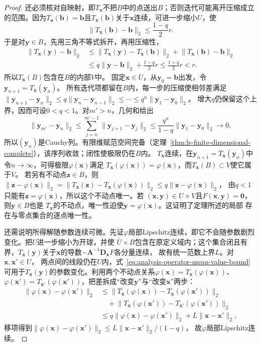 \begin{proof}
还必须核对自映射，即$T_{\bm x}$不把$B$中的点送出$B$；否则迭代可能离开压缩成立的范围。因为$T_{\bm{a}}(\bm{b})=\bm{b}$且$T_{\bm{x}}(\bm{b})$关于$\bm{x}$连续，可进一步缩小$U$，使
\[
 \lVert T_{\bm{x}}(\bm{b})-\bm{b}\rVert_2\leq\frac{1-q}{2}r.
\]
于是对$\bm{y}\in B$，先用三角不等式拆开，再用压缩性，
\[
 \begin{aligned}
  \lVert T_{\bm{x}}(\bm{y})-\bm{b}\rVert_2
  &\leq
  \lVert T_{\bm{x}}(\bm{y})-T_{\bm{x}}(\bm{b})\rVert_2+\lVert T_{\bm{x}}(\bm{b})-\bm{b}\rVert_2\\
  &\leq
  q\lVert\bm{y}-\bm{b}\rVert_2+\frac{1-q}{2}r
  \leq
  \frac{1+q}{2}r
  <r.
 \end{aligned}
\]
所以$T_{\bm{x}}(B)$包含在$B$的内部$V$中。
固定$\bm x\in U$，从$\bm y_0=\bm b$出发，令$\bm y_{n+1}=T_{\bm x}(\bm y_n)$。
所有迭代项都留在$B$内，每一步的压缩使相邻差满足
$\lVert\bm y_{n+1}-\bm y_n\rVert_2\leq q\lVert\bm y_n-\bm y_{n-1}\rVert_2\leq\cdots\leq q^n\lVert\bm y_1-\bm y_0\rVert_2$。
增大$q$仍保留这个上界，因而可设$0<q<1$。对$m'>n$，几何和给出
\[
 \lVert\bm y_{m'}-\bm y_n\rVert_2
 \leq\sum_{j=n}^{m'-1}\lVert\bm y_{j+1}-\bm y_j\rVert_2
 \leq\frac{q^n}{1-q}\lVert\bm y_1-\bm y_0\rVert_2\longrightarrow0,
\]
所以$(\bm y_n)$是Cauchy列。有限维赋范空间完备（定理~\ref{thm:ls-finite-dimensional-complete}），该序列收敛；闭性使极限仍在$B$内。
$T_{\bm x}$连续，在$\bm y_{n+1}=T_{\bm x}(\bm y_n)$中令$n\to\infty$，可得极限$\varphi(\bm x)$满足
$T_{\bm x}(\varphi(\bm x))=\varphi(\bm x)$，而$T_{\bm x}(B)\subset V$使它属于$V$。
若另有不动点$\bm z\in B$，则
$\lVert\bm z-\varphi(\bm x)\rVert_2=\lVert T_{\bm x}(\bm z)-T_{\bm x}(\varphi(\bm x))\rVert_2\leq q\lVert\bm z-\varphi(\bm x)\rVert_2$，
由$q<1$只能有$\bm z=\varphi(\bm x)$，所以这个不动点唯一。若
$(\bm{x},\bm{y})\in U\times V$且$F(\bm{x},\bm{y})=\bm{0}$，则$\bm{y}\in B$也是
$T_{\bm{x}}$的不动点，唯一性迫使$\bm{y}=\varphi(\bm{x})$。这证明了定理所述的局部
存在与零点集合的逐点唯一性。

还需说明所得解随参数连续可微。先证$\varphi$局部Lipschitz连续，即它不会随参数剧烈变化。把$U$进一步缩小为开球，并使
$\overline U\times B$包含在原定义域内；这个集合闭且有界，$T_{\bm x}(\bm y)$关于$\bm x$的导数$-\bm A^{-1}\bm D_{\bm x}F$各分量连续，
故有统一范数上界$L$。对$\bm x,\bm x'\in U$，
两点间的线段仍在$U$内，式~\eqref{eq:analysis-operator-mean-value-bound}
可用于$T_{\bm x}(\bm y)$的参数变化。利用两个不动点关系$\varphi(\bm x)=T_{\bm x}(\varphi(\bm x))$、$\varphi(\bm x')=T_{\bm x'}(\varphi(\bm x'))$，把差拆成“改变$\bm y$”与“改变$\bm x$”两步：
\[
 \begin{aligned}
 \lVert\varphi(\bm{x})-\varphi(\bm{x}')\rVert_2
 &\leq\lVert T_{\bm x}(\varphi(\bm x))-T_{\bm x}(\varphi(\bm x'))\rVert_2\\
 &\quad+\lVert T_{\bm x}(\varphi(\bm x'))-T_{\bm x'}(\varphi(\bm x'))\rVert_2\\
 &\leq q\lVert\varphi(\bm{x})-\varphi(\bm{x}')\rVert_2+L\lVert\bm{x}-\bm{x}'\rVert_2,
 \end{aligned}
\]
移项得到$\lVert\varphi(\bm x)-\varphi(\bm x')\rVert_2
\leq L\lVert\bm x-\bm x'\rVert_2/(1-q)$，
故$\varphi$局部Lipschitz连续。


\end{proof}

